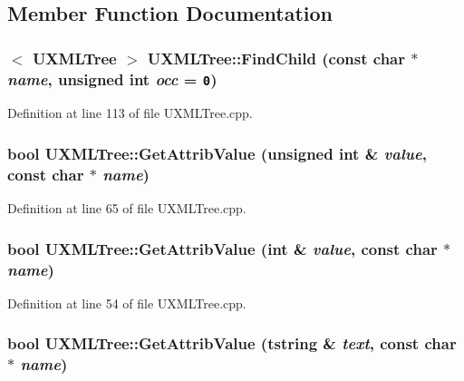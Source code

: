 \subsection{Member Function Documentation}
\hypertarget{class_u_x_m_l_tree_55133de5b659c685d4db66c730b55b98}{
\subsubsection[{FindChild}]{$<$ {\bf UXMLTree} $>$ UXMLTree::FindChild (const char $\ast$ {\em name}, \/  unsigned int {\em occ} = {\tt 0})}}
\label{class_u_x_m_l_tree_55133de5b659c685d4db66c730b55b98}




Definition at line 113 of file UXMLTree.cpp.\hypertarget{class_u_x_m_l_tree_3cf9e4c1b856b3143959df4624cb3be8}{
\subsubsection[{GetAttribValue}]{\setlength{\rightskip}{0pt plus 5cm}bool UXMLTree::GetAttribValue (unsigned int \& {\em value}, \/  const char $\ast$ {\em name})}}
\label{class_u_x_m_l_tree_3cf9e4c1b856b3143959df4624cb3be8}




Definition at line 65 of file UXMLTree.cpp.\hypertarget{class_u_x_m_l_tree_7c795f2aca9fee7edac2b2160f8a65ff}{
\subsubsection[{GetAttribValue}]{\setlength{\rightskip}{0pt plus 5cm}bool UXMLTree::GetAttribValue (int \& {\em value}, \/  const char $\ast$ {\em name})}}
\label{class_u_x_m_l_tree_7c795f2aca9fee7edac2b2160f8a65ff}




Definition at line 54 of file UXMLTree.cpp.\hypertarget{class_u_x_m_l_tree_008c44aa797b9414460e473c2fdff76e}{
\subsubsection[{GetAttribValue}]{\setlength{\rightskip}{0pt plus 5cm}bool UXMLTree::GetAttribValue ({\bf tstring} \& {\em text}, \/  const char $\ast$ {\em name})}}
\label{class_u_x_m_l_tree_008c44aa797b9414460e473c2fdff76e}




